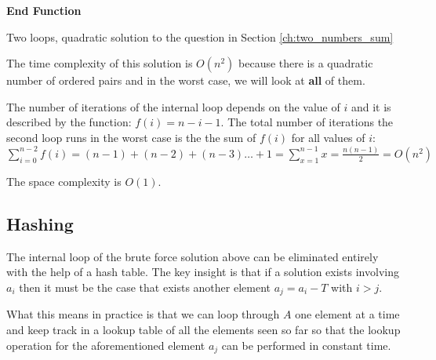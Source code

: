 \begin{algorithm}
	\SetAlgoLined {}
	
	 

	\textbf{End Function}
	
		\caption{Two loops, quadratic solution to the question in Section \ref{ch:two_numbers_sum} }
		\label{algo:two_number_sum_bruteforce}
\end{algorithm}




The time complexity of this solution is $O(n^2)$ because there is a quadratic number of
ordered pairs and in the worst case, we will look at \textbf{all} of them.

The number of iterations of the internal loop depends on the value of $i$ and
it is described by the function: $f(i) = n-i-1$. The total number of iterations the second
loop runs in the worst case is the the sum of $f(i)$ for all values of $i$: 
$\sum_{i=0}^{n-2} f(i) = (n-1) + (n-2) + (n-3) \ldots + 1 =\sum_{x=1}^{n-1} x= \frac{n(n-1)}{2} = O(n^2)$

The space complexity is $O(1)$.



\subsection{Hashing}
\label{sec:two_numbers:hashing}
The internal loop of the brute force solution above can be eliminated entirely with the help of a hash table.
The key insight is that if a solution exists involving $a_i$ then it must be the case that  exists another element $a_j  = a_i-T$ with $i > j$. 

What this means in practice is that we can loop through $A$ one element at a time and keep track in a lookup table of all the elements seen so far so that the lookup operation for the aforementioned element $a_j$ can be performed in constant time.

